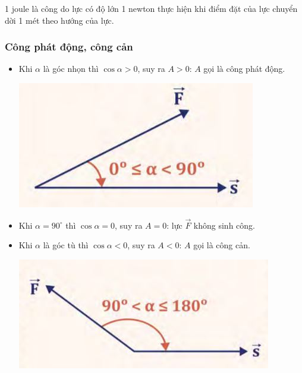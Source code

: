 	1 joule là công do lực có độ lớn 1 newton thực hiện khi điểm đặt của lực chuyển dời 1 mét theo hướng của lực.
	\subsubsection{Công phát động, công cản}
	\begin{itemize}
		\item Khi $\alpha$ là góc nhọn thì $\cos \alpha >0$, suy ra $A>0$: $A$ gọi là công phát động.
		\begin{center}
			\includegraphics[scale=0.5]{../figs/VN10-PH-30-L-022-1-4.JPG}
		\end{center}
		\item Khi $\alpha = 90^\circ$ thì $\cos 
		\alpha = 0$, suy ra $A=0$: lực $\vec{F}$ không sinh công.
		\item Khi $\alpha$ là góc tù thì $\cos \alpha <0$, suy ra $A<0$: $A$ gọi là công cản.
		\begin{center}
			\includegraphics[scale=0.55]{../figs/VN10-PH-30-L-022-1-5.JPG}
		\end{center}
	\end{itemize}
	
	
